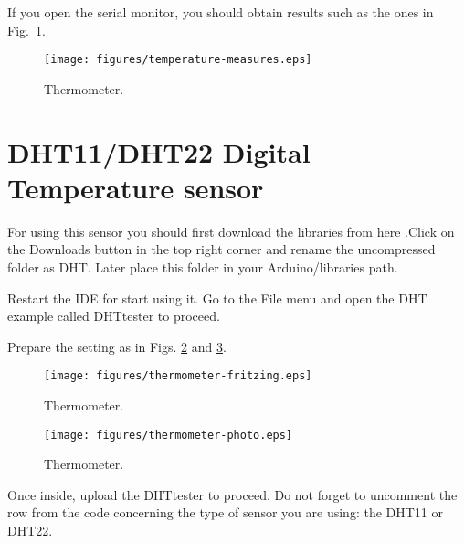If you open the serial monitor, you should obtain results such as the ones in Fig.~\ref{fig:temperature-measures}.

\begin{figure}[htbp]
  \centering
  \texttt{[image: figures/temperature-measures.eps]}
  \caption{Thermometer.}
  \label{fig:temperature-measures}
\end{figure}



\section{DHT11/DHT22 Digital Temperature sensor}

For using this sensor you should first download the libraries from here .Click on the Downloads button in the top right corner and rename the uncompressed folder as DHT. Later place this folder in your Arduino/libraries path. 

Restart the IDE for start using it. Go to the File menu and open the DHT example called DHTtester to proceed.

Prepare the setting as in Figs. \ref{fig:thermometer-fritzing} and \ref{fig:thermometer-photo}.

\begin{figure}[htbp]
  \centering
  \texttt{[image: figures/thermometer-fritzing.eps]}
  \caption{Thermometer.}
  \label{fig:thermometer-fritzing}
\end{figure}

\begin{figure}[htbp]
  \centering
  \texttt{[image: figures/thermometer-photo.eps]}
  \caption{Thermometer.}
  \label{fig:thermometer-photo}
\end{figure}

Once inside, upload the DHTtester to proceed. Do not forget to uncomment the row from the code concerning the type of sensor you are using: the DHT11 or DHT22.

